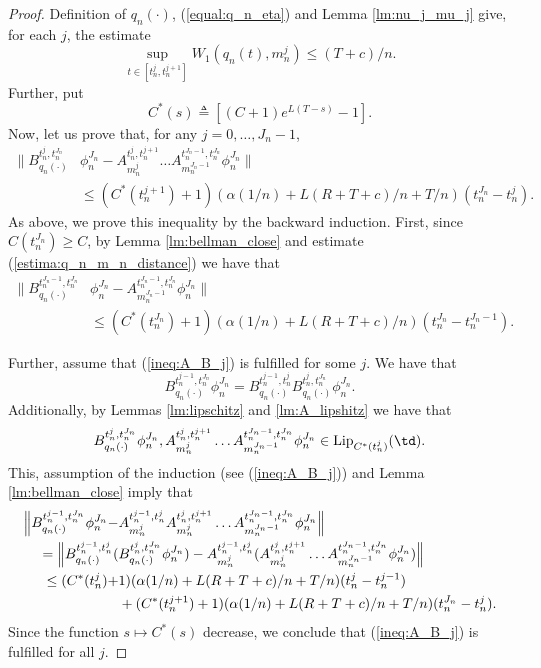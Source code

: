 \documentclass[a4paper,12pt]{article}
\begin{document}
\begin{proof}
	Definition of $q_n(\cdot)$, (\ref{equal:q_n_eta}) and Lemma \ref{lm:nu_j_mu_j} give, for each $j$, the estimate
	\begin{equation}\label{estima:q_n_m_n_distance}
	\sup_{t\in [t^j_n,t^{j+1}_n]}W_1(q_n(t),m^j_n)\leq (T+c)/n.
	\end{equation}
	Further, put
	$$C^*(s)\triangleq[(C +1)e^{L(T-s)}-1].$$
	Now, let us prove that, for any $j=0,\ldots, J_n-1$,
	\begin{equation}\label{ineq:A_B_j}
	\begin{split}
	\|B^{t^j_n,t^{J_n}_n}_{q_n(\cdot)}&\phi^{J_n}_n-A^{t^j_n,t^{j+1}_n}_{m^j_n}\ldots A^{t^{J_n-1}_n,t^{J_n}_n}_{m^{J_n-1}_n}\phi^{J_n}_n\|\\&\leq
	(C^*(t^{j+1}_n)+1)(\alpha(1/n)+L(R+T+c)/n+T/n)(t^{J_n}_n-t^j_n).
	\end{split}
	\end{equation} As above, we prove this inequality by the backward induction.
	First, since $C(t_n^{J_n})\geq C$, by Lemma \ref{lm:bellman_close} and estimate (\ref{estima:q_n_m_n_distance}) we have that 
	\begin{equation*}\begin{split}
	\|B^{t^{J_n-1}_n,t_n^{J_n}}_{q_n(\cdot)}&\phi_n^{J_n}-
	A^{t^{J_n-1}_n,t^{J_n}_n}_{m^{J_n-1}_n}\phi^{J_n}_n\|
	\\&\leq (C^*(t^{J_n}_n)+1)(\alpha(1/n)+L(R+T+c)/n)(t^{J_n}_n-t^{J_n-1}_n). \end{split}
	\end{equation*}
	
	Further, assume that (\ref{ineq:A_B_j}) is fulfilled for some $j$. We have that
	$$B^{t^{j-1}_n,t^{J_n}_n}_{q_n(\cdot)}\phi^{J_n}_n= B^{t^{j-1}_n,t^{j}_n}_{q_n(\cdot)}B^{t^{j}_n,t^{J_n}_n}_{q_n(\cdot)}\phi^{J_n}_n. $$ Additionally, by Lemmas \ref{lm:lipschitz} and \ref{lm:A_lipshitz} we have that
	$$B^{t^{j}_n,t^{J_n}_n}_{q_n(\cdot)}\phi^{J_n}_n,A^{t^j_n,t^{j+1}_n}_{m^j_n}\ldots A^{t^{J_n-1}_n,t^{J_n}_n}_{m^{J_n-1}_n}\phi^{J_n}_n\in\mathrm{Lip}_{C^*(t^j_n)}(\td). $$
	This, assumption of the induction (see (\ref{ineq:A_B_j})) and Lemma \ref{lm:bellman_close} imply that
	\begin{equation*}
	\begin{split}
	\Bigl\|B^{t^{j-1}_n,t^{J_n}_n}_{q_n(\cdot)}\phi^{J_n}_n-&
	A^{t^{j-1}_n,t^{j}_n}_{m^j_n}A^{t^j_n,t^{j+1}_n}_{m^j_n}\ldots A^{t^{J_n-1}_n,t^{J_n}_n}_{m^{J_n-1}_n}\phi^{J_n}_n\Bigr\|\\ = 
	\Bigl\|B^{t^{j-1}_n,t^{j}_n}_{q_n(\cdot)}(&B^{t^{j}_n,t^{J_n}_n}_{q_n(\cdot)}\phi^{J_n}_n)-
	A^{t^{j-1}_n,t^{j}_n}_{m^j_n}(A^{t^j_n,t^{j+1}_n}_{m^j_n}\ldots A^{t^{J_n-1}_n,t^{J_n}_n}_{m^{J_n-1}_n}\phi^{J_n}_n)\Bigr\|
	\\
	\leq (C^*(t^{j}_n)+&1)(\alpha(1/n)+L(R+T+c)/n+T/n)(t^{j}_n-t^{j-1}_n)\\&+ (C^*(t^{j+1}_n)+1)(\alpha(1/n)+L(R+T+c)/n+T/n)(t^{J_n}_n-t^j_n).
	\end{split}
	\end{equation*}
	Since the function $s\mapsto C^*(s)$ decrease, we conclude that (\ref{ineq:A_B_j}) is fulfilled for all $j$. 
	

\end{proof}
\end{document}
